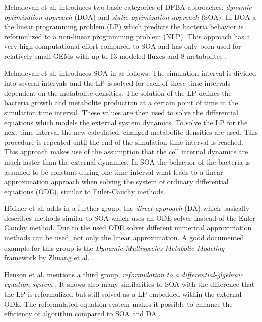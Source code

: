 Mehadevan et al. introduces two basic categories of DFBA approaches: \textit{dynamic optimization approach} (DOA) and \textit{static
optimization approach} (SOA)\cite{mahadevan_dynamic_2002}. In DOA a the linear programming problem (LP) which predicts the bacteria
behavior is reformulized to a non-linear programming problem (NLP). This approach has a very high computational effort
\cite{hoffner_reliable_2013} compared to SOA and has only been used for relatively small GEMs with up to 13 modeled fluxes and 8 metabolites
\cite{luo_dynamic_2006} \cite{luo_photosynthetic_2009}.

Mehadevan et al. introduces SOA in \cite{mahadevan_dynamic_2002} as follows: The simulation interval is divided into several intervals and the LP is solved for each
of these time intervals dependent on the metabolite densities. The solution of the LP defines the bacteria growth and metabolite
production at a certain point of time in the simulation time interval. These values are then used to solve the differential equations
which models the external system dynamics. To solve the LP for the next time interval the new calculated, changed metabolite densities
are used. This procedure is repeated until the end of the simulation time interval is reached. This approach makes use of the
assumption that the cell internal dynamics are much faster than the external dynamics. In SOA the behavior of the bacteria is assumed
to be constant during one time interval what leads to a linear approximation approach when solving the system of ordinary differential
equations (ODE), similar to Euler-Cauchy methods.

Höffner et al. adds in \cite{hoffner_reliable_2013} a further group, the \textit{direct approach} (DA) which basically describes methods
similar to SOA which uses an ODE solver instead of the Euler-Cauchy method. Due to the used ODE solver different numerical approximation
methods can be used, not only the linear approximation. A good documented example for this group is the \textit{Dynamic Multispecies
Metabolic Modeling} framework by Zhuang et al. \cite{zhuang_design_2012}.

Henson et al. mentions a third group, \textit{reformulation to a differential-glgebraic equation system} \cite{henson_dynamic_2014}.
It shows also many similarities to SOA with the difference that the LP is reformulized but still solved as a LP embedded within 
the external ODE. The reformulated equation system makes it possible to enhance the efficiency of algorithm compared to SOA and DA
\cite{hoffner_reliable_2013}.

